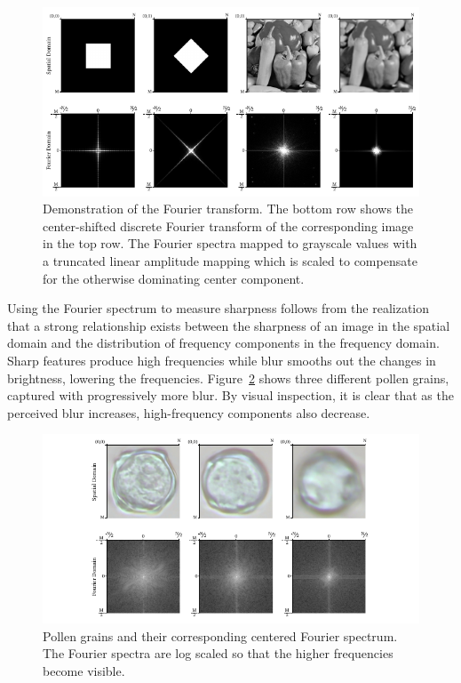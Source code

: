 \begin{figure}[htbp]
  \centering
  \includegraphics[width=\textwidth]{figs/method/fourier/fourier-examples.pdf}
  \caption[Demonstration of the Fourier transform]{
    Demonstration of the Fourier transform.
The bottom row shows the center-shifted discrete Fourier transform of the corresponding image in the top row.
The Fourier spectra mapped to grayscale values with a truncated linear amplitude mapping which is scaled to compensate for the otherwise dominating center component.}\label{fig:fourier-demo}
\end{figure}

Using the Fourier spectrum to measure sharpness follows from the realization that a strong relationship exists between the sharpness of an image in the spatial domain and the distribution of frequency components in the frequency domain.
Sharp features produce high frequencies while blur smooths out the changes in brightness, lowering the frequencies.
Figure~\ref{fig:fourier} shows three different pollen grains, captured with progressively more blur.
By visual inspection, it is clear that as the perceived blur increases, high-frequency components also decrease.


\begin{figure}[htbp]
  \centering
  \includegraphics[width=\textwidth]{figs/method/fourier/fourier-pollen.pdf}
  \caption[Fourier spectrum]{Pollen grains and their corresponding centered Fourier spectrum.
The Fourier spectra are log scaled so that the higher frequencies become visible.}\label{fig:fourier}
\end{figure}

